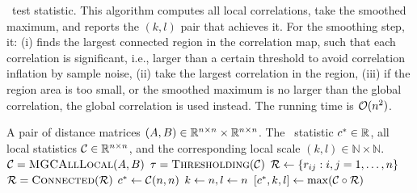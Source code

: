 \documentclass{article}
\begin{document}
\begin{algorithm}
\caption{\Mgc~test statistic. This algorithm computes all local correlations, take the smoothed maximum, and reports the $(k,l)$ pair that achieves it. For the smoothing step, it: (i) finds the largest connected region in the correlation map, such that each correlation is significant, i.e., larger than a certain threshold to avoid correlation inflation by sample noise, (ii) take the largest correlation in the region, (iii) if the region area is too small, or the smoothed maximum is no larger than the global correlation, the global correlation is used instead. The running time is $\mathcal{O}(n^2)$.}
\label{alg:sample_mgc}
\begin{algorithmic}[1]
\Require A pair of distance matrices $(A, B) \in \mathbb{R}^{n \times n} \times \mathbb{R}^{n \times n}$.
\Ensure The \Mgc~statistic $c^{*} \in \mathbb{R}$, all local statistics $\mathcal{C} \in \mathbb{R}^{n \times n}$, and the corresponding local scale $(k,l) \in \mathbb{N} \times \mathbb{N}$.
\State $\mathcal{C}=\textsc{MGCAllLocal}(A,B)$ 
\State $\tau = \textsc{Thresholding}(\mathcal{C})$ 
 
\State $\mathcal{R} \leftarrow \{r_{ij} : i,j = 1,\ldots, n\}$ 
\State $\mathcal{R}  = \textsc{Connected}(\mathcal{R} )$ 
\State $c^{*} \leftarrow \mathcal{C}(n,n)$ 
\State $k \leftarrow n, l \leftarrow n$
 
\State $[c^{*},k,l] \leftarrow \max (\mathcal{C} \circ \mathcal{R})$ 
\EndIf
\EndFunction
\end{algorithmic}
\end{algorithm}

\clearpage


\end{document}
